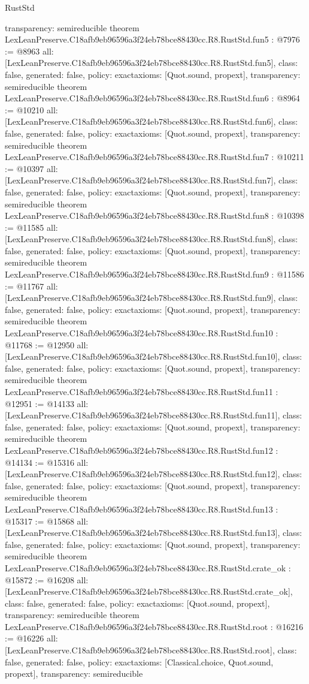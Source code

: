 \begin{lexlean}{RustStd}
\begin{coremodule}
{  transparency: semireducible
}
theorem LexLeanPreserve.C18afb9eb96596a3f24eb78bce88430cc.R8.RustStd.fun5 : @7976 := @8963 {
  all: [LexLeanPreserve.C18afb9eb96596a3f24eb78bce88430cc.R8.RustStd.fun5],
  class: false,
  generated: false,
  policy: exact{axioms: [Quot.sound, propext]},
  transparency: semireducible
}
theorem LexLeanPreserve.C18afb9eb96596a3f24eb78bce88430cc.R8.RustStd.fun6 : @8964 := @10210 {
  all: [LexLeanPreserve.C18afb9eb96596a3f24eb78bce88430cc.R8.RustStd.fun6],
  class: false,
  generated: false,
  policy: exact{axioms: [Quot.sound, propext]},
  transparency: semireducible
}
theorem LexLeanPreserve.C18afb9eb96596a3f24eb78bce88430cc.R8.RustStd.fun7 : @10211 := @10397 {
  all: [LexLeanPreserve.C18afb9eb96596a3f24eb78bce88430cc.R8.RustStd.fun7],
  class: false,
  generated: false,
  policy: exact{axioms: [Quot.sound, propext]},
  transparency: semireducible
}
theorem LexLeanPreserve.C18afb9eb96596a3f24eb78bce88430cc.R8.RustStd.fun8 : @10398 := @11585 {
  all: [LexLeanPreserve.C18afb9eb96596a3f24eb78bce88430cc.R8.RustStd.fun8],
  class: false,
  generated: false,
  policy: exact{axioms: [Quot.sound, propext]},
  transparency: semireducible
}
theorem LexLeanPreserve.C18afb9eb96596a3f24eb78bce88430cc.R8.RustStd.fun9 : @11586 := @11767 {
  all: [LexLeanPreserve.C18afb9eb96596a3f24eb78bce88430cc.R8.RustStd.fun9],
  class: false,
  generated: false,
  policy: exact{axioms: [Quot.sound, propext]},
  transparency: semireducible
}
theorem LexLeanPreserve.C18afb9eb96596a3f24eb78bce88430cc.R8.RustStd.fun10 : @11768 := @12950 {
  all: [LexLeanPreserve.C18afb9eb96596a3f24eb78bce88430cc.R8.RustStd.fun10],
  class: false,
  generated: false,
  policy: exact{axioms: [Quot.sound, propext]},
  transparency: semireducible
}
theorem LexLeanPreserve.C18afb9eb96596a3f24eb78bce88430cc.R8.RustStd.fun11 : @12951 := @14133 {
  all: [LexLeanPreserve.C18afb9eb96596a3f24eb78bce88430cc.R8.RustStd.fun11],
  class: false,
  generated: false,
  policy: exact{axioms: [Quot.sound, propext]},
  transparency: semireducible
}
theorem LexLeanPreserve.C18afb9eb96596a3f24eb78bce88430cc.R8.RustStd.fun12 : @14134 := @15316 {
  all: [LexLeanPreserve.C18afb9eb96596a3f24eb78bce88430cc.R8.RustStd.fun12],
  class: false,
  generated: false,
  policy: exact{axioms: [Quot.sound, propext]},
  transparency: semireducible
}
theorem LexLeanPreserve.C18afb9eb96596a3f24eb78bce88430cc.R8.RustStd.fun13 : @15317 := @15868 {
  all: [LexLeanPreserve.C18afb9eb96596a3f24eb78bce88430cc.R8.RustStd.fun13],
  class: false,
  generated: false,
  policy: exact{axioms: [Quot.sound, propext]},
  transparency: semireducible
}
theorem LexLeanPreserve.C18afb9eb96596a3f24eb78bce88430cc.R8.RustStd.crate_ok : @15872 := @16208 {
  all: [LexLeanPreserve.C18afb9eb96596a3f24eb78bce88430cc.R8.RustStd.crate_ok],
  class: false,
  generated: false,
  policy: exact{axioms: [Quot.sound, propext]},
  transparency: semireducible
}
theorem LexLeanPreserve.C18afb9eb96596a3f24eb78bce88430cc.R8.RustStd.root : @16216 := @16226 {
  all: [LexLeanPreserve.C18afb9eb96596a3f24eb78bce88430cc.R8.RustStd.root],
  class: false,
  generated: false,
  policy: exact{axioms: [Classical.choice, Quot.sound, propext]},
  transparency: semireducible
}


\end{coremodule}
\end{lexlean}
